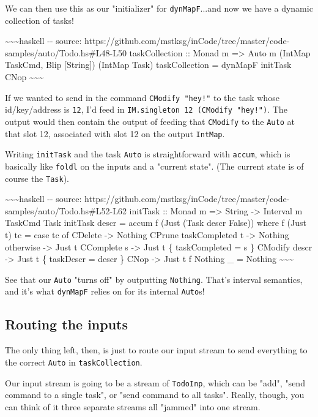 \documentclass[]{article}
\begin{document}
We can then use this as our "initializer" for \texttt{dynMapF}...and now we have
a dynamic collection of tasks!

\textasciitilde{}\textasciitilde{}\textasciitilde{}haskell -\/- source:
https://github.com/mstksg/inCode/tree/master/code-samples/auto/Todo.hs\#L48-L50
taskCollection :: Monad m =\textgreater{} Auto m (IntMap TaskCmd, Blip
{[}String{]}) (IntMap Task) taskCollection = dynMapF initTask CNop
\textasciitilde{}\textasciitilde{}\textasciitilde{}

If we wanted to send in the command \texttt{CModify\ "hey!"} to the task whose
id/key/address is \texttt{12}, I'd feed in
\texttt{IM.singleton\ 12\ (CModify\ "hey!")}. The output would then contain the
output of feeding that \texttt{CModify} to the \texttt{Auto} at that slot 12,
associated with slot 12 on the output \texttt{IntMap}.

Writing \texttt{initTask} and the task \texttt{Auto} is straightforward with
\texttt{accum}, which is basically like \texttt{foldl} on the inputs and a
"current state". (The current state is of course the \texttt{Task}).

\textasciitilde{}\textasciitilde{}\textasciitilde{}haskell -\/- source:
https://github.com/mstksg/inCode/tree/master/code-samples/auto/Todo.hs\#L52-L62
initTask :: Monad m =\textgreater{} String -\textgreater{} Interval m TaskCmd
Task initTask descr = accum f (Just (Task descr False)) where f (Just t) tc =
case tc of CDelete -\textgreater{} Nothing CPrune \textbar{} taskCompleted t
-\textgreater{} Nothing \textbar{} otherwise -\textgreater{} Just t CComplete s
-\textgreater{} Just t \{ taskCompleted = s \} CModify descr -\textgreater{}
Just t \{ taskDescr = descr \} CNop -\textgreater{} Just t f Nothing \_ =
Nothing \textasciitilde{}\textasciitilde{}\textasciitilde{}

See that our \texttt{Auto} "turns off" by outputting \texttt{Nothing}. That's
interval semantics, and it's what \texttt{dynMapF} relies on for its internal
\texttt{Auto}s!

\subsection{Routing the inputs}

The only thing left, then, is just to route our input stream to send everything
to the correct \texttt{Auto} in \texttt{taskCollection}.

Our input stream is going to be a stream of \texttt{TodoInp}, which can be
"add", "send command to a single task", or "send command to all tasks". Really,
though, you can think of it three separate streams all "jammed" into one stream.
\end{document}
